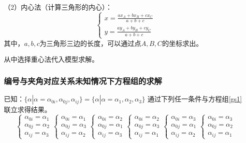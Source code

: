 \documentclass[12pt]{ctexart}
\begin{document}
\begin{spacing}{1.5}
（2）内心法（计算三角形的内心）：
\begin{equation}
	\begin{cases}
		x=\frac{ax_A+bx_B+cx_C}{a+b+c}\\
		y=\frac{ay_A+by_B+cy_C}{a+b+c}
	\end{cases}
\end{equation}
其中，$a,b,c$为三角形三边的长度，可以通过点$A,B,C$的坐标求出。

从中选择重心法代入模型求解。

\subsubsection{编号与夹角对应关系未知情况下方程组的求解}
已知：$\{\alpha|\alpha=\alpha_{0i},\alpha_{0j},\alpha_{ij}\}=\{\alpha|\alpha=\alpha_{1},\alpha_{2},\alpha_{3}\}$
通过下列任一条件与方程组\ref{gs1}联立求得结果。
\begin{equation}
\begin{cases}
	\alpha_{0i}=\alpha_{1} \\
	\alpha_{0j}=\alpha_{2} \\
	\alpha_{ij}=\alpha_{3} 
\end{cases}
\begin{cases}
	\alpha_{0i}=\alpha_{1} \\
	\alpha_{0j}=\alpha_{3} \\
	\alpha_{ij}=\alpha_{2}  
\end{cases}
\begin{cases}
	\alpha_{0i}=\alpha_{2} \\
	\alpha_{0j}=\alpha_{1} \\
	\alpha_{ij}=\alpha_{3}  
\end{cases}
\begin{cases}
	\alpha_{0i}=\alpha_{2} \\
	\alpha_{0j}=\alpha_{3} \\
	\alpha_{ij}=\alpha_{1}  
\end{cases}
\begin{cases}
	\alpha_{0i}=\alpha_{3} \\
	\alpha_{0j}=\alpha_{1} \\
	\alpha_{ij}=\alpha_{2}  
\end{cases}
\begin{cases}
	\alpha_{0i}=\alpha_{3} \\
	\alpha_{0j}=\alpha_{2} \\
	\alpha_{ij}=\alpha_{1}  
\end{cases}
\label{gs2}
\end{equation}


\end{spacing}
\end{document}
